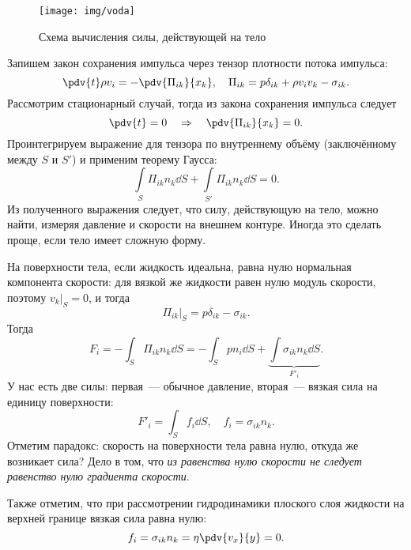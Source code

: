 \begin{figure}[ht!]
    \centering
    \texttt{[image: img/voda]}
    \caption{Схема вычисления силы, действующей на тело}
    \label{fig:chemvush}
\end{figure}

Запишем закон сохранения импульса через тензор плотности потока импульса:
\begin{equation}
	\pdv{t} \rho v_i = -\pdv{\Pi_{ik}}{x_k}, \quad
	\Pi_{ik} = p\delta_{ik}+\rho v_i v_k - \sigma_{ik}.
\end{equation}
Рассмотрим стационарный случай, тогда из закона сохранения импульса следует
\begin{equation}
    \pdv{t} = 0 \quad \Rightarrow \quad \pdv{\Pi_{ik}}{x_k}=0.
\end{equation}
Проинтегрируем выражение для тензора по внутреннему объёму (заключённому между $S$ и $S'$)  и применим теорему  Гаусса:
\begin{equation}
    \int\limits_S \Pi_{ik} n_k \dd{S} + \int\limits_{S'} \Pi_{ik} n_k \dd{S} = 0.
\end{equation}
Из полученного выражения следует, что силу, действующую на тело, можно найти, измеряя давление и скорости на внешнем контуре. Иногда это сделать проще, если тело имеет сложную форму.


На поверхности тела, если жидкость идеальна, равна нулю нормальная компонента скорости: для вязкой же жидкости равен нулю модуль скорости, поэтому $v_k |_S=0$, и тогда
\begin{equation}
 	\Pi_{ik}\big|_S = p\delta_{ik}-\sigma_{ik}.
 \end{equation}
 Тогда
\begin{equation}
    F_i = -\int_S \Pi_{ik} n_k \dd{S} =  -\int_S p n_i \dd{S} + \underbrace{\int \sigma_{ik} n_k \dd{S}}_{F'_i}.
\end{equation}
У нас есть две силы: первая~--- обычное давление, вторая~---  вязкая сила на единицу поверхности:
\begin{equation}
    F'_i = \int_S f_i \dd{S}, \quad f_i=\sigma_{ik} n_k.
\end{equation}
Отметим парадокс: скорость на поверхности тела равна нулю,  откуда же возникает сила? Дело в том, что \textit{из равенства нулю скорости не следует равенство нулю градиента скорости}.


Также отметим, что при рассмотрении гидродинамики плоского слоя жидкости на верхней границе вязкая сила равна нулю:
\begin{equation}
    f_i = \sigma_{ik} n_k =
    \eta\pdv{v_x}{y} = 0.
\end{equation}

